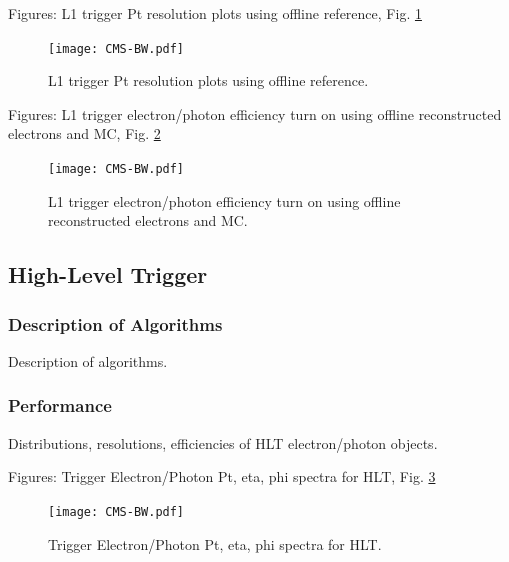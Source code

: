 Figures: L1 trigger Pt resolution plots using offline reference, Fig. \ref{fig:L1TriggerObjectResolutions}

 \begin{figure}[htb]
  \begin{center}
    \texttt{[image: CMS-BW.pdf]}
  \end{center}
  \caption[L1 trigger Pt resolution plots using offline reference]{L1 trigger Pt resolution plots using offline reference.}
  \label{fig:L1TriggerObjectResolutions}
 \end{figure}

Figures: L1 trigger electron/photon efficiency turn on using offline reconstructed electrons and MC, Fig. \ref{fig:L1TriggerObjectEfficiencies}

 \begin{figure}[htb]
  \begin{center}
    \texttt{[image: CMS-BW.pdf]}
  \end{center}
  \caption[L1 trigger electron/photon efficiency turn on using offline reconstructed electrons and MC]{L1 trigger electron/photon efficiency turn on using offline reconstructed electrons and MC.}
  \label{fig:L1TriggerObjectEfficiencies}
 \end{figure}


\subsection{High-Level Trigger}
\subsubsection{Description of Algorithms}
Description of algorithms.
\subsubsection{Performance}
Distributions, resolutions, efficiencies of HLT electron/photon objects.

Figures: Trigger Electron/Photon Pt, eta, phi spectra for HLT, Fig. \ref{fig:HLTriggerObjectSpectra}

 \begin{figure}[htb]
  \begin{center}
    \texttt{[image: CMS-BW.pdf]}
  \end{center}
  \caption[Trigger Electron/Photon Pt, eta, phi spectra for HLT]{Trigger Electron/Photon Pt, eta, phi spectra for HLT.}
  \label{fig:HLTriggerObjectSpectra}
 \end{figure}


